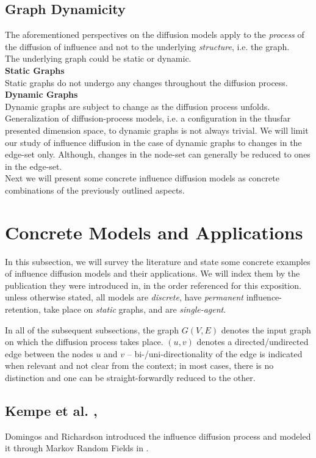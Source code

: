 \documentclass[twocolumn, 10pt]{article}
\begin{document}
\subsection{Graph Dynamicity}
The aforementioned perspectives on the diffusion models apply to the \textit{process} of the diffusion of influence and not to the underlying \textit{structure}, i.e. the graph. \\
The underlying graph could be static or dynamic.\\
\textbf{Static Graphs} \\
Static graphs do not undergo any changes throughout the diffusion process.
\textbf{Dynamic Graphs} \\
Dynamic graphs are subject to change as the diffusion process unfolds. Generalization of diffusion-process models, i.e. a configuration in the thusfar presented dimension space, to dynamic graphs is not always trivial. We will limit our study of influence diffusion in the case of dynamic graphs to changes in the edge-set only. Although, changes in the node-set can generally be reduced to ones in the edge-set. \\

Next we will present some concrete influence diffusion models as concrete combinations of the previously outlined aspects.
\section{Concrete Models and Applications}
In this subsection, we will survey the literature and state some concrete examples of influence diffusion models and their applications. We will index them by the publication they were introduced in, in the order referenced for this exposition. unless otherwise stated, all models are \textit{discrete}, have \textit{permanent} influence-retention, take place on \textit{static} graphs, and are \textit{single-agent}. 

In all of the subsequent subsections, the graph $G(V, E)$ denotes the input graph on which the diffusion process takes place. $(u, v)$ denotes a directed/undirected edge between the nodes $u$ and $v$ -- bi-/uni-directionality of the edge is indicated when relevant and not clear from the context; in most cases, there is no distinction and one can be straight-forwardly reduced to the other.
\subsection{Kempe et al. \cite{kempe}, \cite{kempe0}}
Domingos and Richardson introduced the influence diffusion process and modeled it through Markov Random Fields in \cite{dom}. 
\end{document}
